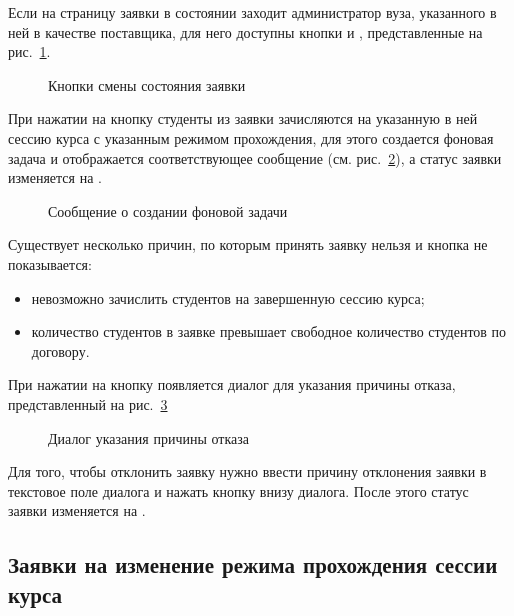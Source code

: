Если на страницу заявки в состоянии  заходит администратор вуза, 
указанного в ней в качестве поставщика, для него доступны кнопки  и 
, представленные на рис.~\ref{img:student:req_detail_buttons}.
\begin{figure}[H]
	\caption{Кнопки смены состояния заявки}
	\label{img:student:req_detail_buttons}
\end{figure}

При нажатии на кнопку  студенты из заявки зачисляются на указанную в ней сессию курса 
с указанным режимом прохождения, для этого создается фоновая задача и отображается соответствующее сообщение 
(см. рис.~\ref{img:student:req_accept}), а статус заявки изменяется на .
\begin{figure}[H]
	\caption{Сообщение о создании фоновой задачи}
	\label{img:student:req_accept}
\end{figure}

Существует несколько причин, по которым принять заявку нельзя и кнопка  не показывается:
\begin{itemize}
	\item невозможно зачислить студентов на завершенную сессию курса;
	\item количество студентов в заявке превышает свободное количество студентов по договору.
\end{itemize}

При нажатии на кнопку  появляется диалог для указания причины отказа, 
представленный на рис.~\ref{img:student:req_detail_decline}
\begin{figure}[H]
	\caption{Диалог указания причины отказа}
	\label{img:student:req_detail_decline}
\end{figure}
Для того, чтобы отклонить заявку нужно ввести причину отклонения заявки в текстовое поле диалога 
и нажать кнопку  внизу диалога. После этого статус заявки изменяется на .


\subsection{Заявки на изменение режима прохождения сессии курса}

